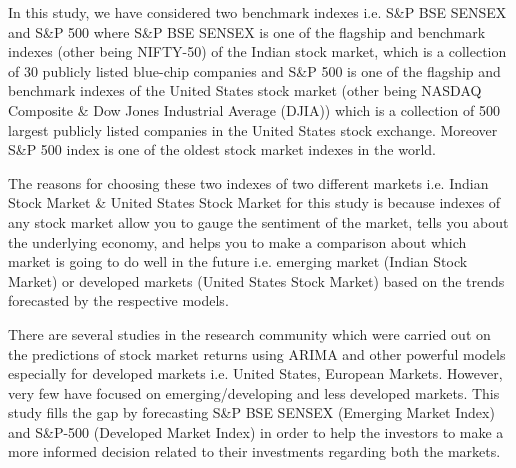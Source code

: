 \documentclass[conference]{IEEEtran}
\begin{document}
In this study, we have considered two benchmark indexes i.e. S\&P BSE SENSEX and S\&P 500 where S\&P BSE SENSEX is one of the flagship and benchmark indexes (other being NIFTY-50) of the Indian stock market, which is a collection of 30 publicly listed blue-chip companies and S\&P 500 is one of the flagship and benchmark indexes of the United States stock market (other being NASDAQ Composite \& Dow Jones Industrial Average (DJIA)) which is a collection of 500 largest publicly listed companies in the United States stock exchange. Moreover S\&P 500 index is one of the oldest stock market indexes in the world.

The reasons for choosing these two indexes of two different markets i.e. Indian Stock Market \& United States Stock Market for this study is because indexes of any stock market allow you to gauge the sentiment of the market, tells you about the underlying economy, and helps you to make a comparison about which market is going to do well in the future i.e. emerging market (Indian Stock Market) or developed markets (United States Stock Market) based on the trends forecasted by the respective models.

There are several studies in the research community which were carried out on the predictions of stock market returns using ARIMA and other powerful models especially for developed markets i.e. United States, European Markets. However, very few have focused on emerging/developing and less developed markets. This study fills the gap by forecasting S\&P BSE SENSEX (Emerging Market Index) and S\&P-500 (Developed Market Index) in order to help the investors to make a more informed decision related to their investments regarding both the markets.
\end{document}
